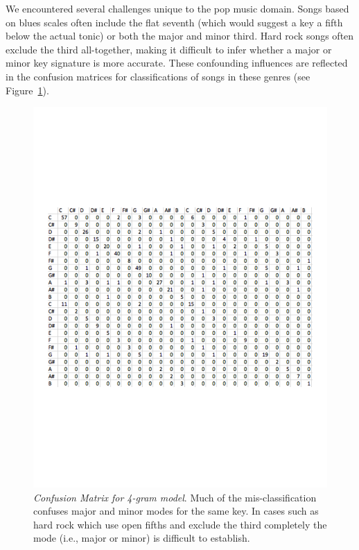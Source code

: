\documentclass[letterpaper]{article}
\begin{document}
We encountered several challenges unique to the pop music domain. Songs based on blues scales often include the flat seventh (which would suggest a key a fifth below the actual tonic) or both the major and minor third. Hard rock songs often exclude the third all-together, making it difficult to infer whether a major or minor key signature is more accurate. These confounding influences are reflected in the confusion matrices for classifications of songs in these genres (see Figure~\ref{fig:confusion_matrix}).

\begin{figure}
  \centering
 \includegraphics[width=\textwidth]{./confusion_matrix.pdf}
  \caption{\emph{Confusion Matrix for 4-gram model}. Much of the mis-classification confuses major and minor modes for the same key. In cases such as hard rock which use open fifths and exclude the third completely the mode (i.e., major or minor) is difficult to establish.}
  \label{fig:confusion_matrix}
\end{figure}
\end{document}
